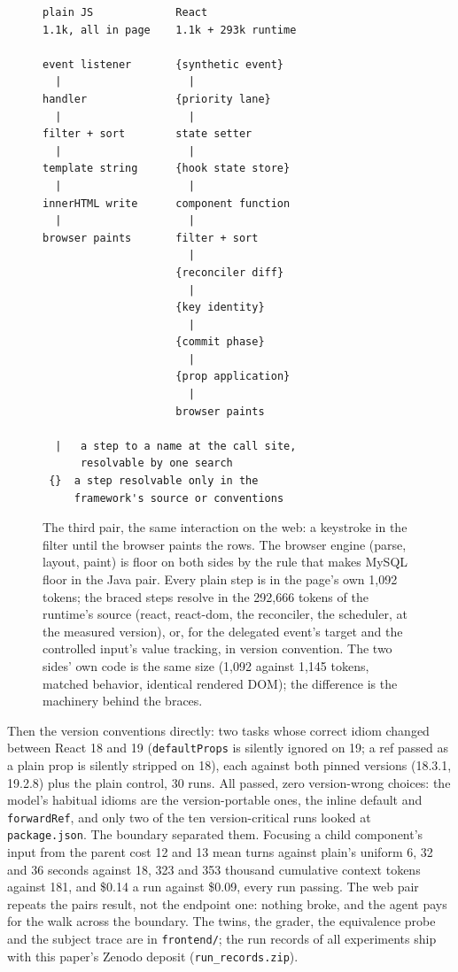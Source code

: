 \documentclass[journal]{IEEEtran}
\begin{document}
\begin{figure}[!t]
\footnotesize
\begin{verbatim}
plain JS             React
1.1k, all in page    1.1k + 293k runtime

event listener       {synthetic event}
  |                    |
handler              {priority lane}
  |                    |
filter + sort        state setter
  |                    |
template string      {hook state store}
  |                    |
innerHTML write      component function
  |                    |
browser paints       filter + sort
                       |
                     {reconciler diff}
                       |
                     {key identity}
                       |
                     {commit phase}
                       |
                     {prop application}
                       |
                     browser paints

  |   a step to a name at the call site,
      resolvable by one search
 {}  a step resolvable only in the
     framework's source or conventions
\end{verbatim}
\caption{The third pair, the same interaction on the web: a keystroke in
the filter until the browser paints the rows. The browser engine (parse,
layout, paint) is floor on both sides by the rule that makes MySQL floor
in the Java pair. Every plain step is in the page's own 1,092 tokens; the
braced steps resolve in the 292,666 tokens of the runtime's source
(react, react-dom, the reconciler, the scheduler, at the measured
version), or, for the delegated event's target and the controlled
input's value tracking, in version convention. The two sides' own code
is the same size (1,092 against 1,145 tokens, matched behavior,
identical rendered DOM); the difference is the machinery behind the
braces.}
\label{fig:webpaths}
\end{figure}

Then the version conventions directly: two tasks whose correct idiom
changed between React 18 and 19 (\texttt{defaultProps} is silently
ignored on 19; a ref passed as a plain prop is silently stripped on
18), each against both pinned versions (18.3.1, 19.2.8) plus the plain
control, 30 runs. All passed, zero version-wrong choices: the model's
habitual idioms are the version-portable ones, the inline default and
\texttt{forwardRef}, and only two of the ten version-critical runs
looked at \texttt{package.json}. The boundary separated them.
Focusing a child component's input from the parent cost 12 and 13 mean
turns against plain's uniform 6, 32 and 36 seconds against 18, 323 and
353 thousand cumulative context tokens against 181, and \$0.14 a run
against \$0.09, every run passing. The web pair repeats the pairs
result, not the endpoint one: nothing broke, and the agent pays for
the walk across the boundary. The twins, the grader, the equivalence
probe and the subject trace are in \texttt{frontend/}; the run
records of all experiments ship with this paper's Zenodo deposit
(\texttt{run\_records.zip}).
\end{document}
